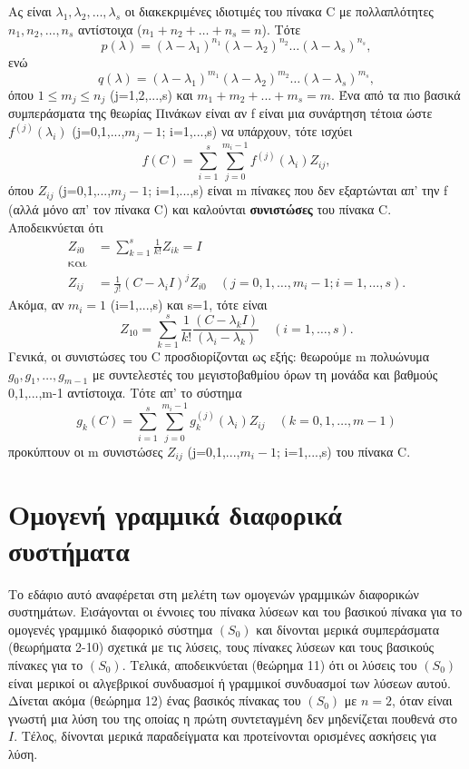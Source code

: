 \documentclass[11pt,a4paper,twoside]{book}
\begin{document}
Ας είναι $\lambda_1, \lambda_2, \dots, \lambda_s$ οι διακεκριμένες ιδιοτιμές του πίνακα C με πολλαπλότητες $n_1, n_2, \dots, n_s$ αντίστοιχα ($n_1+n_2+\dots+n_s=n$). Τότε
\[
p(\lambda) = (\lambda-\lambda_1)^{n_1}(\lambda-\lambda_2)^{n_2}\dots(\lambda-\lambda_s)^{n_s},
\]
ενώ
\[
q(\lambda) = (\lambda-\lambda_1)^{m_1}(\lambda-\lambda_2)^{m_2}\dots(\lambda-\lambda_s)^{m_s},
\]
όπου $1 \leq m_j \leq n_j$ (j=1,2,...,s) και $m_1+m_2+...+m_s=m$. Ένα από τα πιο βασικά συμπεράσματα της θεωρίας Πινάκων είναι αν f είναι μια συνάρτηση τέτοια ώστε $f^{(j)}(\lambda_i)$ (j=0,1,...,$m_j-1$; i=1,...,s) να υπάρχουν, τότε ισχύει
\[
f(C) = \sum_{i=1}^{s} \sum_{j=0}^{m_i-1} f^{(j)}(\lambda_i) Z_{ij},
\]
όπου $Z_{ij}$ (j=0,1,...,$m_j-1$; i=1,...,s) είναι m πίνακες που δεν εξαρτώνται απ' την f (αλλά μόνο απ' τον πίνακα C) και καλούνται \textbf{συνιστώσες} του πίνακα C. Αποδεικνύεται ότι
\begin{align*}
Z_{i0} &= \sum_{k=1}^{s} \frac{1}{k!} Z_{ik} = I \\
\text{και} \\
Z_{ij} &= \frac{1}{j!} (C-\lambda_i I)^j Z_{i0} \quad (j=0,1,\dots,m_i-1; i=1,\dots,s).
\end{align*}
Ακόμα, αν $m_i=1$ (i=1,...,s) και s=1, τότε είναι
\[
Z_{10} = \sum_{k=1}^{s} \frac{1}{k!} \frac{(C-\lambda_k I)}{(\lambda_i-\lambda_k)} \quad (i=1,\dots,s).
\]
Γενικά, οι συνιστώσες του C προσδιορίζονται ως εξής: θεωρούμε m πολυώνυμα $g_0, g_1, \dots, g_{m-1}$ με συντελεστές του μεγιστοβαθμίου όρων τη μονάδα και βαθμούς 0,1,...,m-1 αντίστοιχα. Τότε απ' το σύστημα
\[
g_k(C) = \sum_{i=1}^{s} \sum_{j=0}^{m_i-1} g_k^{(j)}(\lambda_i) Z_{ij} \quad (k=0,1,\dots,m-1)
\]
προκύπτουν οι m συνιστώσες $Z_{ij}$ (j=0,1,...,$m_i-1$; i=1,...,s) του πίνακα C.

\section{Ομογενή γραμμικά διαφορικά συστήματα}
Το εδάφιο αυτό αναφέρεται στη μελέτη των ομογενών γραμμικών διαφορικών συστημάτων. Εισάγονται οι έννοιες του πίνακα λύσεων και του βασικού πίνακα για το ομογενές γραμμικό διαφορικό σύστημα $(S_0)$ και δίνονται μερικά συμπεράσματα (θεωρήματα 2-10) σχετικά με τις λύσεις, τους πίνακες λύσεων και τους βασικούς πίνακες για το $(S_0)$. Τελικά, αποδεικνύεται (θεώρημα 11) ότι οι λύσεις του $(S_0)$ είναι μερικοί οι αλγεβρικοί συνδυασμοί ή γραμμικοί συνδυασμοί των λύσεων αυτού. Δίνεται ακόμα (θεώρημα 12) ένας βασικός πίνακας του $(S_0)$ με $n=2$, όταν είναι γνωστή μια λύση του της οποίας η πρώτη συντεταγμένη δεν μηδενίζεται πουθενά στο $Ι$. Τέλος, δίνονται μερικά παραδείγματα και προτείνονται ορισμένες ασκήσεις για λύση.
\end{document}
